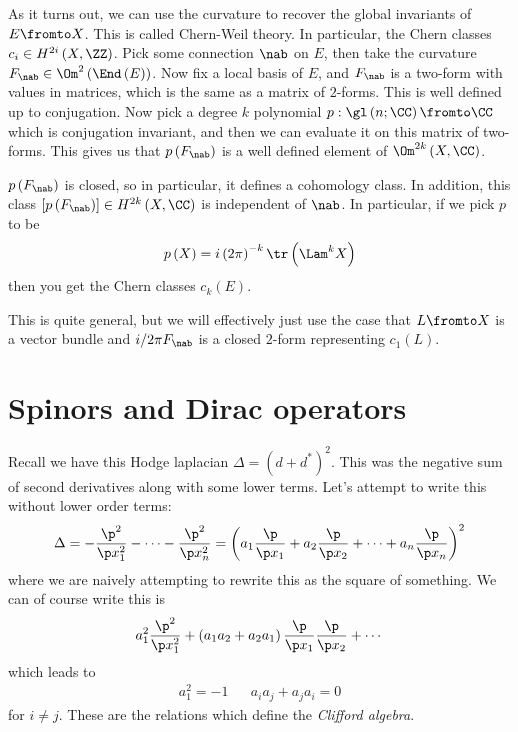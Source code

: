 \documentclass{amsart}
\begin{document}
As it turns out, we can use the curvature to recover the global invariants of $E \fromto X$.
This is called Chern-Weil theory. 
In particular, the Chern classes $c_i\in H^{2i}\left( X , \ZZ \right)$. 
Pick some connection $\nab$ on $E$, then take the curvature 
$F_\nab \in \Om^2\left( \End\left( E \right) \right)$.
Now fix a local basis of $E$, and $F_\nab$ is a two-form with values in matrices, 
which is the same as a matrix of $2$-forms. 
This is well defined up to conjugation. 
Now pick a degree $k$ polynomial $p: \gl\left( n;\CC \right) \fromto \CC$ 
which is conjugation invariant,
and then we can evaluate it on this matrix of two-forms. 
This gives us that $p\left( F_\nab \right)$ 
is a well defined element of $\Om^{2k} \left( X , \CC \right)$.

\begin{thm}
$p\left( F_\nab \right)$ is closed, so in particular, it defines a cohomology class. 
In addition, this class $\left[ p\left( F_\nab \right) \right] \in H^{2k}\left( X , \CC \right)$
is independent of $\nab$.
In particular, if we pick $p$ to be 
\begin{equation}
p\left( X \right) = i \left( 2\pi \right)^{-k} \tr\left( \Lam^k X \right)
\end{equation}
then you get the Chern classes $c_k\left( E \right)$.
\end{thm}

This is quite general, but we will effectively just use the case that $L\fromto X$ 
is a vector bundle and $i / 2\pi F_\nab$ is a closed $2$-form representing 
$c_1\left( L \right)$.


\section{Spinors and Dirac operators}

Recall we have this Hodge laplacian $\Delta = \left( d + d^* \right)^2$. This was
the negative sum of second derivatives along with some lower terms.
Let's attempt to write this without lower order terms:
\begin{equation}
\Delta = -\frac{\p^2}{\p x_1^2} - \cdots - \frac{\p^2}{\p x_n^2} 
= \left( a_1 \frac{\p}{\p x_1} + a_2
\frac{\p}{\p x_2} + \cdots + 
a_n \frac{\p}{\p x_n} \right)^2
\end{equation}
where we are naively attempting to rewrite this as the square of something.
We can of course write this is
\begin{equation}
a_1^2 \frac{\p^2}{\p x_1^2} + 
\left( 
a_1 a_2 + a_2 a_1\right) \frac{\p}{\p x_1}
\frac{\p}{\p x_2}+ \cdots 
\end{equation}
which leads to
\begin{align}
a_1^2 = -1 &&
a_i a_j + a_j a_i = 0
\end{align}
for $i\neq j$. These are the relations which define the \emph{Clifford algebra}.
\end{document}
